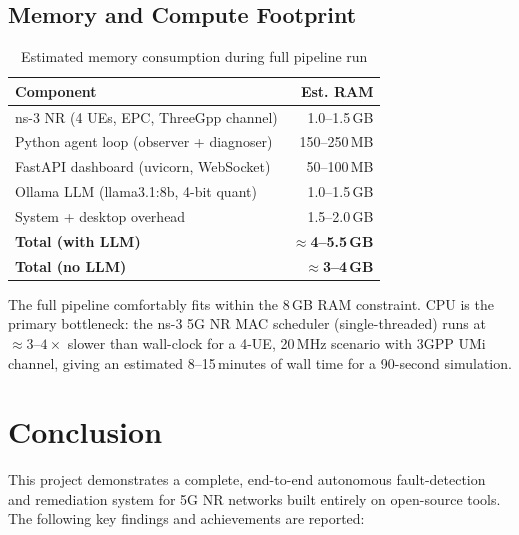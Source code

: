 \documentclass[12pt,a4paper]{article}
\begin{document}
\subsection{Memory and Compute Footprint}

\begin{table}[H]
\centering
\caption{Estimated memory consumption during full pipeline run}
\label{tab:mem}
\begin{tabular}{lr}
\toprule
\textbf{Component} & \textbf{Est. RAM} \\
\midrule
ns-3 NR (4 UEs, EPC, ThreeGpp channel)  & 1.0--1.5\,GB \\
Python agent loop (observer + diagnoser) & 150--250\,MB \\
FastAPI dashboard (uvicorn, WebSocket)   & 50--100\,MB \\
Ollama LLM (llama3.1:8b, 4-bit quant)   & 1.0--1.5\,GB \\
System + desktop overhead                & 1.5--2.0\,GB \\
\midrule
\textbf{Total (with LLM)}  & \textbf{$\approx$4--5.5\,GB} \\
\textbf{Total (no LLM)}    & \textbf{$\approx$3--4\,GB} \\
\bottomrule
\end{tabular}
\end{table}

The full pipeline comfortably fits within the 8\,GB RAM constraint.
CPU is the primary bottleneck: the ns-3 5G NR MAC scheduler (single-threaded)
runs at $\approx 3$--$4\times$ slower than wall-clock for a 4-UE, 20\,MHz
scenario with 3GPP UMi channel, giving an estimated 8--15\,minutes of wall
time for a 90-second simulation.

\section{Conclusion}

This project demonstrates a complete, end-to-end autonomous fault-detection
and remediation system for 5G NR networks built entirely on open-source
tools. The following key findings and achievements are reported:
\end{document}
